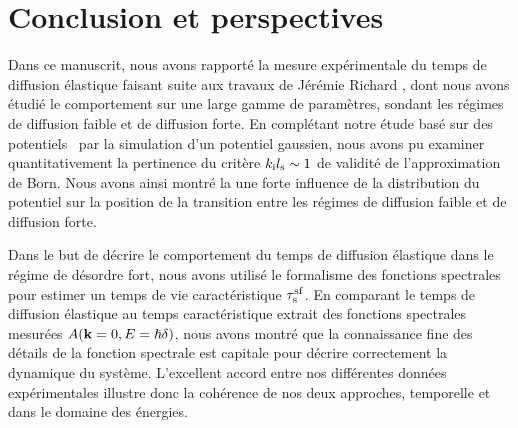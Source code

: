 
\chapter{Conclusion et perspectives}

Dans ce manuscrit, nous avons rapporté la mesure expérimentale du temps de diffusion élastique faisant suite aux travaux de Jérémie Richard \citep{richard2015propagation}, dont nous avons étudié le comportement sur une large gamme de paramètres, sondant les régimes de diffusion faible et de diffusion forte. En complétant notre étude basé sur des potentiels \speckle\ par la simulation d'un potentiel gaussien, nous avons pu examiner quantitativement la pertinence du critère $k_{\mathrm{i}}l_{\mathrm{s}}\sim 1$ de validité de l'approximation de Born. Nous avons ainsi montré la une forte influence de la distribution du potentiel sur la position de la transition entre les régimes de diffusion faible et de diffusion forte. 


Dans le but de décrire le comportement du temps de diffusion élastique dans le régime de désordre fort, nous avons utilisé le formalisme des fonctions spectrales pour estimer un temps de vie caractéristique $\tau_{\mathrm{s}}^{\mathrm{sf}}$. En comparant le temps de diffusion élastique au temps caractéristique extrait des fonctions spectrales mesurées $A(\mathbf{k}=0,E=\hslash\delta)$, nous avons montré que la connaissance fine des détails de la fonction spectrale est capitale pour décrire correctement la dynamique du système. L'excellent accord entre nos différentes données expérimentales illustre donc la cohérence de nos deux approches, temporelle et dans le domaine des énergies.

